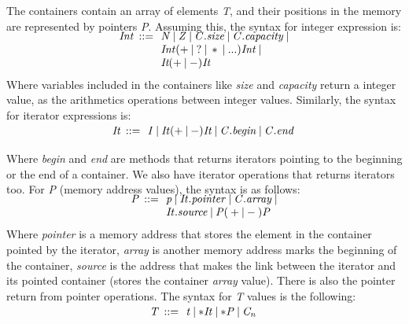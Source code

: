 \documentclass[a4paper]{llncs}
\begin{document}
	
	The containers contain an array of elements \emph{T}, and their positions in the memory are represented by pointers \emph{P}.
Assuming this, the syntax for integer expression is:
%
\[\begin{array}{r@{\:\:}c@{\:\:}l}
\\[-5ex]
\mathit{Int}  & ::= & \: \mathit{N} \: | \: \mathit{Z} \: | \: \mathit{C.size} \: | \: \mathit{C.capacity} \: | \\
              &     & \: \mathit{Int} ( + \: | \: ? \: | \: * \: | \: ...) \mathit{Int}  \: | \\
              &     & \: \textit{It} ( + \: | \: - ) \textit{It} 
\end{array}
\]
%
Where variables included in the containers like \emph{size} and \emph{capacity} return a integer value, as the arithmetics operations between integer values. 
Similarly, the syntax for iterator expressions is:
%
%
\[\begin{array}{r@{\:\:}c@{\:\:}l}\label{iterator-semantics}
\\[-5ex]
\mathit{It}   & ::= & \: \mathit{I} \: | \: \mathit{It} ( + \: | \: - ) \mathit{It} \: | \: \mathit{C.begin} \: | \: \mathit{C.end} \:  \\
\end{array}
\]
%
Where \emph{begin} and \emph{end} are methods that returns iterators pointing to the beginning or the end of a container. We also have iterator operations that returns iterators too. 
For \emph{P} (memory address values), the syntax is as follows:
%	
\[\begin{array}{r@{\:\:}c@{\:\:}l}\label{pointer-semantics}
\\[-5ex]
\mathit{P}  & ::= & \: \mathit{p} \: | \: \mathit{It.pointer} \: | \: \mathit{C.array} \: | \\
            &     & \: \mathit{It.source} \: | \: \mathit{P}  ( \: + \: | \: - \: )  \textit{P} \: \\
\end{array}
\]
%	
Where \emph{pointer} is a memory address that stores the element in the container pointed by the iterator, \emph{array} is another memory address marks the beginning of the container, \emph{source} is the address that makes the link between the iterator and its pointed container (stores the container \emph{array} value). There is also the pointer return from pointer operations.
The syntax for \emph{T} values is the following: 
%
\[\begin{array}{r@{\:\:}c@{\:\:}l}\label{element-semantics}
\\[-5ex]
\mathit{T}   & ::= & \: \mathit{t} \: | \: \mathit{*It} \: | \: \mathit{*P} \: | \: \mathit{C_n} \:  \\
\end{array}
\]
\end{document}
